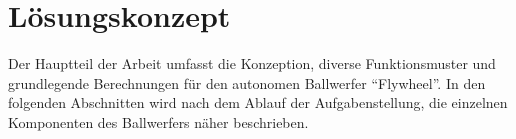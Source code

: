 ﻿\section{Lösungskonzept}
Der Hauptteil der Arbeit umfasst die Konzeption, diverse Funktionsmuster und grundlegende Berechnungen für den autonomen Ballwerfer \enquote{Flywheel}. In den folgenden Abschnitten wird nach dem Ablauf der Aufgabenstellung, die einzelnen Komponenten des Ballwerfers näher beschrieben. 